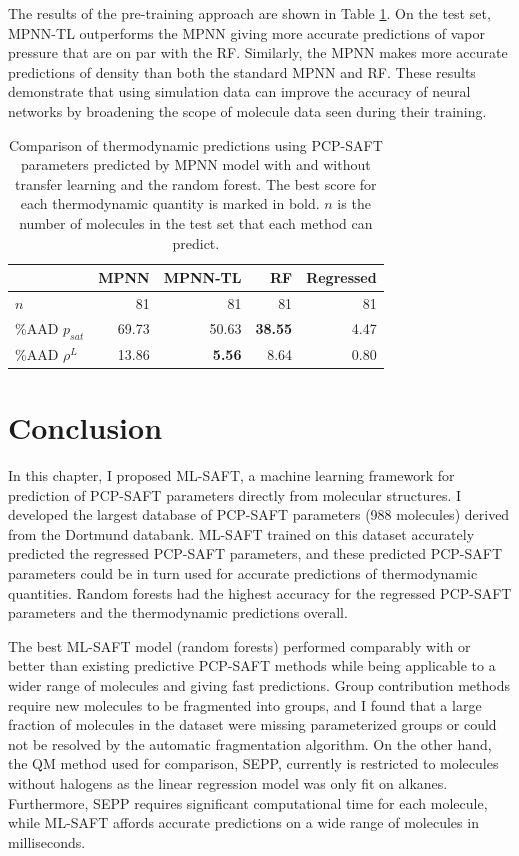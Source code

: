 The results of the pre-training approach are shown in Table \ref{tab:scores_tl}. On the test set, MPNN-TL outperforms the MPNN giving more accurate predictions of vapor pressure that are on par with the RF. Similarly, the MPNN makes more accurate predictions of density than both the standard MPNN and RF. These results demonstrate that using simulation data can improve the accuracy of neural networks by broadening the scope of molecule data seen during their training. 

\begin{table}
    \label{tab:scores_tl}
    \caption{Comparison of thermodynamic predictions using PCP-SAFT parameters predicted by MPNN model with and without transfer learning and the random forest. The best score for each thermodynamic quantity  is marked in bold. $n$ is the number of molecules in the test set that each method can predict.}
    \begin{center}
            \begin{tabular}{lrrr|r}
                & MPNN & MPNN-TL & RF & Regressed \\
                \hline
                $n$ & 81 & 81 & 81 & 81 \\
                \%AAD $p_{sat}$ & 69.73 & 50.63 & \textbf{38.55} & 4.47 \\
                \%AAD $\rho^{L}$ & 13.86 & \textbf{5.56} & 8.64 & 0.80 \\
            \end{tabular}
    \end{center}
\end{table}

\section{Conclusion}

In this chapter, I proposed ML-SAFT, a machine learning framework for prediction of PCP-SAFT parameters directly from molecular structures. I developed the largest database of PCP-SAFT parameters (988 molecules) derived from the Dortmund databank. ML-SAFT trained on this dataset accurately predicted the regressed PCP-SAFT parameters, and these predicted PCP-SAFT parameters could be in turn used for accurate predictions of thermodynamic quantities. Random forests had the highest accuracy for the regressed PCP-SAFT parameters and the thermodynamic predictions overall.

The best ML-SAFT model (random forests) performed comparably with or better than existing predictive PCP-SAFT methods while being applicable to a wider range of molecules and giving fast predictions. Group contribution methods require new molecules to be fragmented into groups, and I found that a large fraction of molecules in the dataset were missing parameterized groups or could not be resolved by the automatic fragmentation algorithm. On the other hand, the QM method used for comparison, SEPP, currently is restricted to molecules without halogens as the linear regression model was only fit on alkanes. Furthermore, SEPP requires significant computational time for each molecule, while ML-SAFT affords accurate predictions on a wide range of molecules in milliseconds.

